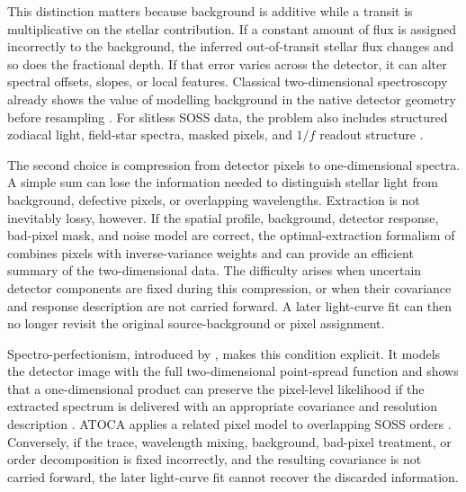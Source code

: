 This distinction matters because background is additive while a transit is
multiplicative on the stellar contribution. If a constant amount of flux is
assigned incorrectly to the background, the inferred out-of-transit stellar
flux changes and so does the fractional depth. If that error varies across the
detector, it can alter spectral offsets, slopes, or local features. Classical
two-dimensional spectroscopy already shows the value of modelling background
in the native detector geometry before resampling
\citep{Kelson2003}. For slitless SOSS data, the problem also includes structured
zodiacal light, field-star spectra, masked pixels, and $1/f$ readout structure
\citep{RadicaEtAl2023,HolmbergMadhusudhan2023}.


The second choice is compression from detector pixels to one-dimensional
spectra. A simple sum can lose the information needed to distinguish stellar
light from background, defective pixels, or overlapping wavelengths. Extraction
is not inevitably lossy, however. If the spatial profile, background, detector
response, bad-pixel mask, and noise model are correct, the optimal-extraction
formalism of \citet{Horne1986} combines pixels with inverse-variance weights and
can provide an efficient summary of the two-dimensional data. The difficulty
arises when uncertain detector components are fixed during this compression, or
when their covariance and response description are not carried forward. A later
light-curve fit can then no longer revisit the original source-background or
pixel assignment.


Spectro-perfectionism, introduced by \citet{BoltonSchlegel2010}, makes this
condition explicit. It models the detector image with the full
two-dimensional point-spread function and shows that a one-dimensional product
can preserve the pixel-level likelihood if the extracted spectrum is delivered
with an appropriate covariance and resolution description
\citep{BoltonEtAl2012}. ATOCA applies a related pixel model
to overlapping SOSS orders \citep{DarveauBernierEtAl2022}. Conversely, if the
trace, wavelength mixing, background, bad-pixel treatment, or order
decomposition is fixed incorrectly, and the resulting covariance is not carried
forward, the later light-curve fit cannot recover the discarded information.

